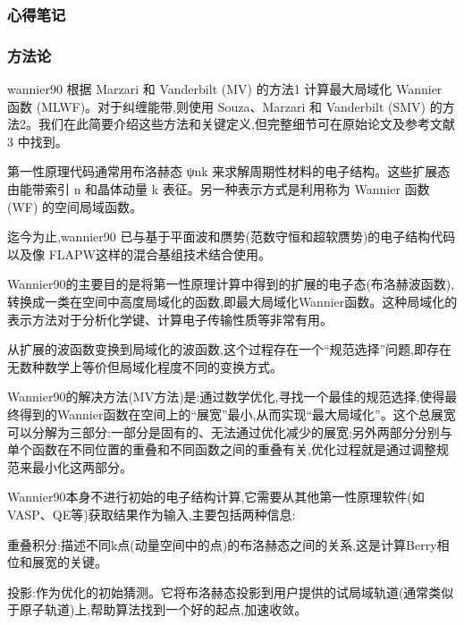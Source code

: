 \documentclass[lang=cn,scheme=chinese,color=blue,device=normal,toc=onecol,math=cm]{elegantbook}
\begin{document}
\subsubsection{心得笔记}


\subsubsection{方法论}


wannier90 根据 Marzari 和 Vanderbilt (MV) 的方法1 计算最大局域化 Wannier 函数 (MLWF)。对于纠缠能带,则使用 Souza、Marzari 和 Vanderbilt (SMV) 的方法2。我们在此简要介绍这些方法和关键定义,但完整细节可在原始论文及参考文献3 中找到。\par


第一性原理代码通常用布洛赫态 ψnk 来求解周期性材料的电子结构。这些扩展态由能带索引 n 和晶体动量 k 表征。另一种表示方式是利用称为 Wannier 函数 (WF) 的空间局域函数。\par


迄今为止,wannier90 已与基于平面波和赝势(范数守恒和超软赝势)的电子结构代码以及像 FLAPW这样的混合基组技术结合使用。\par


Wannier90的主要目的是将第一性原理计算中得到的扩展的电子态(布洛赫波函数),转换成一类在空间中高度局域化的函数,即最大局域化Wannier函数。这种局域化的表示方法对于分析化学键、计算电子传输性质等非常有用。\par


从扩展的波函数变换到局域化的波函数,这个过程存在一个“规范选择”问题,即存在无数种数学上等价但局域化程度不同的变换方式。\par


Wannier90的解决方法(MV方法)是:通过数学优化,寻找一个最佳的规范选择,使得最终得到的Wannier函数在空间上的“展宽”最小,从而实现“最大局域化”。这个总展宽可以分解为三部分:一部分是固有的、无法通过优化减少的展宽;另外两部分分别与单个函数在不同位置的重叠和不同函数之间的重叠有关,优化过程就是通过调整规范来最小化这两部分。\par


Wannier90本身不进行初始的电子结构计算,它需要从其他第一性原理软件(如VASP、QE等)获取结果作为输入,主要包括两种信息:\par


重叠积分:描述不同k点(动量空间中的点)的布洛赫态之间的关系,这是计算Berry相位和展宽的关键。\par


投影:作为优化的初始猜测。它将布洛赫态投影到用户提供的试局域轨道(通常类似于原子轨道)上,帮助算法找到一个好的起点,加速收敛。\par
\end{document}
